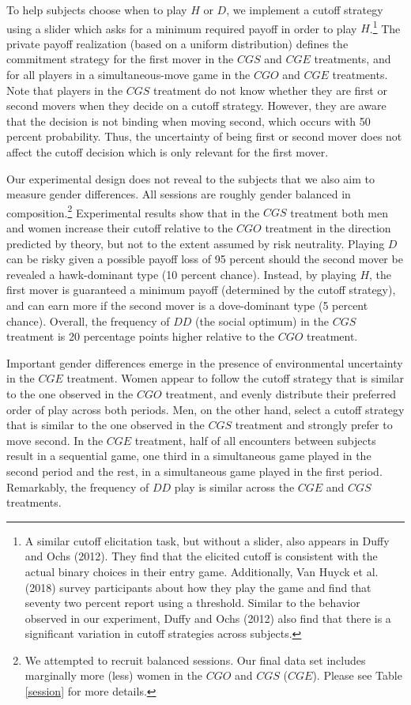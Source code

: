 \documentclass[11pt, letterpaper]{article}
\theoremstyle{plain}
\begin{document}
To help subjects choose when to play $H$ or $D$, we implement a cutoff strategy using a slider which asks for a minimum required payoff in order to play $H$.\footnote{A similar cutoff elicitation task, but without a slider, also appears in Duffy and Ochs (2012). They find that the elicited cutoff is consistent with the actual binary choices in their entry game. Additionally, Van Huyck et al. (2018) survey participants about how they play the game and find that seventy two percent report using a threshold. Similar to the behavior observed in our experiment, Duffy and Ochs (2012) also find that there is a significant variation in cutoff strategies across subjects.} The private payoff realization (based on a uniform distribution) defines the commitment strategy for the first mover in the $CGS$ and $CGE$ treatments, and for all players in a simultaneous-move game in the $CGO$ and $CGE$ treatments. Note that players in the $CGS$ treatment do not know whether they are first or second movers when they decide on a cutoff strategy. However, they are aware that the decision is not binding when moving second, which occurs with 50 percent probability. Thus, the uncertainty of being first or second mover does not affect the cutoff decision which is only relevant for the first mover.

 Our experimental design does not reveal to the subjects that we also aim to measure gender differences. All sessions are roughly gender balanced in composition.\footnote{We attempted to recruit balanced sessions. Our final data set includes marginally more (less) women in the $CGO$ and $CGS$ ($CGE$). Please see Table \ref{session} for more details.} Experimental results show that in the $CGS$ treatment both men and women increase their cutoff relative to the $CGO$ treatment in the direction predicted by theory, but not to the extent assumed by risk neutrality. Playing $D$ can be risky given a possible payoff loss of 95 percent should the second mover be revealed a hawk-dominant type (10 percent chance). Instead, by playing $H$, the first mover is guaranteed a minimum payoff (determined by the cutoff strategy), and can earn more if the second mover is a dove-dominant type (5 percent chance). Overall, the frequency of $DD$ (the social optimum) in the $CGS$ treatment is 20 percentage points higher relative to the $CGO$ treatment. 

 Important gender differences emerge in the presence of environmental uncertainty in the $CGE$ treatment. Women appear to follow the cutoff strategy that is similar to the one observed in the $CGO$ treatment, and evenly distribute their preferred order of play across both periods. Men, on the other hand, select a cutoff strategy that is similar to the one observed in the $CGS$ treatment and strongly prefer to move second. In the $CGE$ treatment, half of all encounters between subjects result in a sequential game, one third in a simultaneous game played in the second period and the rest, in a simultaneous game played in the first period. Remarkably, the frequency of $DD$ play is similar across the $CGE$ and $CGS$ treatments.
\end{document}
